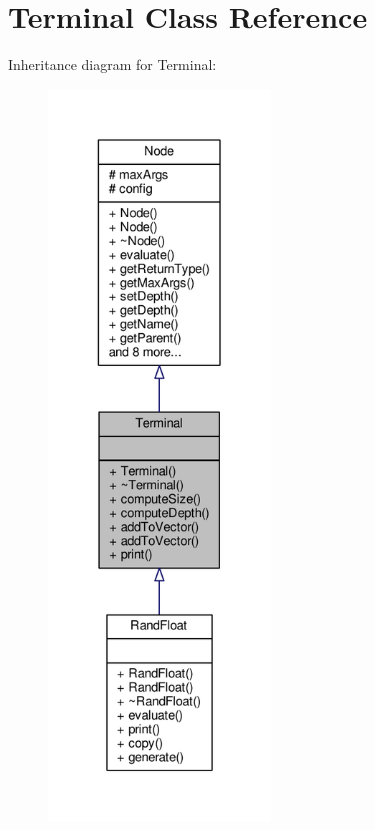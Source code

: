 \hypertarget{classTerminal}{}\section{Terminal Class Reference}
\label{classTerminal}


Inheritance diagram for Terminal\+:
\nopagebreak
\begin{figure}[H]
\begin{center}
\leavevmode
\includegraphics[height=550pt]{classTerminal__inherit__graph}
\end{center}
\end{figure}


